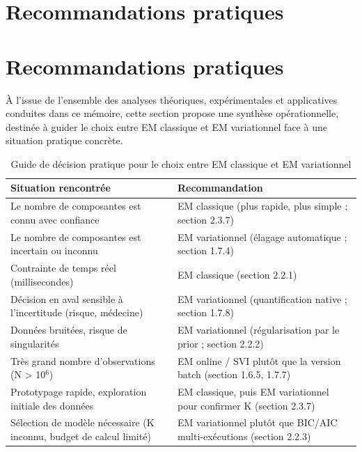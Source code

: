 \section{Recommandations pratiques}
\section{Recommandations pratiques}
À l'issue de l'ensemble des analyses théoriques, expérimentales et applicatives conduites dans ce mémoire, cette section propose une synthèse opérationnelle, destinée à guider le choix entre EM classique et EM variationnel face à une situation pratique concrète.

\begin{table}[H]
\centering
\small
\setlength{\tabcolsep}{0.14cm}
\begin{tabular}{|p{7.42cm}|p{7.42cm}|}
\hline
\textbf{Situation rencontrée} & \textbf{Recommandation} \\
\hline
Le nombre de composantes est connu avec confiance & EM classique (plus rapide, plus simple ; section 2.3.7) \\
\hline
Le nombre de composantes est incertain ou inconnu & EM variationnel (élagage automatique ; section 1.7.4) \\
\hline
Contrainte de temps réel (millisecondes) & EM classique (section 2.2.1) \\
\hline
Décision en aval sensible à l'incertitude (risque, médecine) & EM variationnel (quantification native ; section 1.7.8) \\
\hline
Données bruitées, risque de singularités & EM variationnel (régularisation par le prior ; section 2.2.2) \\
\hline
Très grand nombre d'observations (N > 10$^{6}$) & EM online / SVI plutôt que la version batch (section 1.6.5, 1.7.7) \\
\hline
Prototypage rapide, exploration initiale des données & EM classique, puis EM variationnel pour confirmer K (section 2.3.7) \\
\hline
Sélection de modèle nécessaire (K inconnu, budget de calcul limité) & EM variationnel plutôt que BIC/AIC multi-exécutions (section 2.2.3) \\
\hline
\end{tabular}
\caption{Guide de décision pratique pour le choix entre EM classique et EM variationnel}
\label{tab:3_4}
\end{table}
